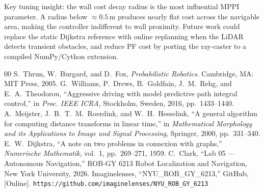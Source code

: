 \documentclass[conference]{IEEEtran}
\begin{document}
Key tuning insight: the wall cost decay radius is the most influential MPPI parameter. A radius below ${\approx}0.5$\,m produces nearly flat cost across the navigable area, making the controller indifferent to wall proximity. Future work could replace the static Dijkstra reference with online replanning when the LiDAR detects transient obstacles, and reduce PF cost by porting the ray-caster to a compiled NumPy/Cython extension.

\begin{thebibliography}{00}
 S.~Thrun, W.~Burgard, and D.~Fox, \textit{Probabilistic Robotics}. Cambridge, MA: MIT Press, 2005.
 G.~Williams, P.~Drews, B.~Goldfain, J.~M.~Rehg, and E.~A.~Theodorou, ``Aggressive driving with model predictive path integral control,'' in \textit{Proc. IEEE ICRA}, Stockholm, Sweden, 2016, pp.~1433--1440.
 A.~Meijster, J.~B.~T.~M.~Roerdink, and W.~H.~Hesselink, ``A general algorithm for computing distance transforms in linear time,'' in \textit{Mathematical Morphology and its Applications to Image and Signal Processing}, Springer, 2000, pp.~331--340.
 E.~W.~Dijkstra, ``A note on two problems in connexion with graphs,'' \textit{Numerische Mathematik}, vol.~1, pp.~269--271, 1959.
 C.~Clark, ``Lab 05 --- Autonomous Navigation,'' ROB-GY 6213 Robot Localization and Navigation, New York University, 2026.
 Imaginelenses, ``NYU\_ROB\_GY\_6213,'' GitHub, [Online]. \texttt{https://github.com/imaginelenses/NYU\_ROB\_GY\_6213}
\end{thebibliography}
\end{document}

